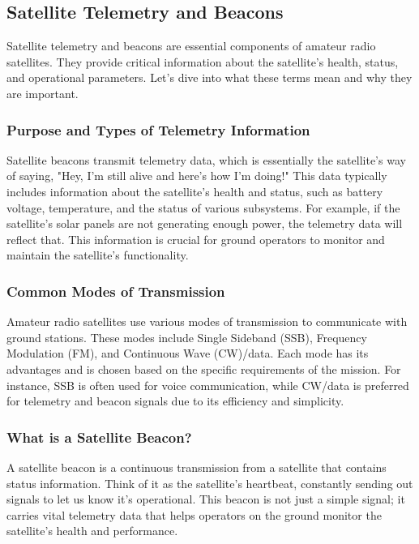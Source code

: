 \subsection{Satellite Telemetry and Beacons}
\label{subsec:sat-telemetry-beacons}

Satellite telemetry and beacons are essential components of amateur radio satellites. They provide critical information about the satellite's health, status, and operational parameters. Let's dive into what these terms mean and why they are important.

\subsubsection*{Purpose and Types of Telemetry Information}
Satellite beacons transmit telemetry data, which is essentially the satellite's way of saying, "Hey, I'm still alive and here's how I'm doing!" This data typically includes information about the satellite's health and status, such as battery voltage, temperature, and the status of various subsystems. For example, if the satellite's solar panels are not generating enough power, the telemetry data will reflect that. This information is crucial for ground operators to monitor and maintain the satellite's functionality.

\subsubsection*{Common Modes of Transmission}
Amateur radio satellites use various modes of transmission to communicate with ground stations. These modes include Single Sideband (SSB), Frequency Modulation (FM), and Continuous Wave (CW)/data. Each mode has its advantages and is chosen based on the specific requirements of the mission. For instance, SSB is often used for voice communication, while CW/data is preferred for telemetry and beacon signals due to its efficiency and simplicity.

\subsubsection*{What is a Satellite Beacon?}
A satellite beacon is a continuous transmission from a satellite that contains status information. Think of it as the satellite's heartbeat, constantly sending out signals to let us know it's operational. This beacon is not just a simple signal; it carries vital telemetry data that helps operators on the ground monitor the satellite's health and performance.

